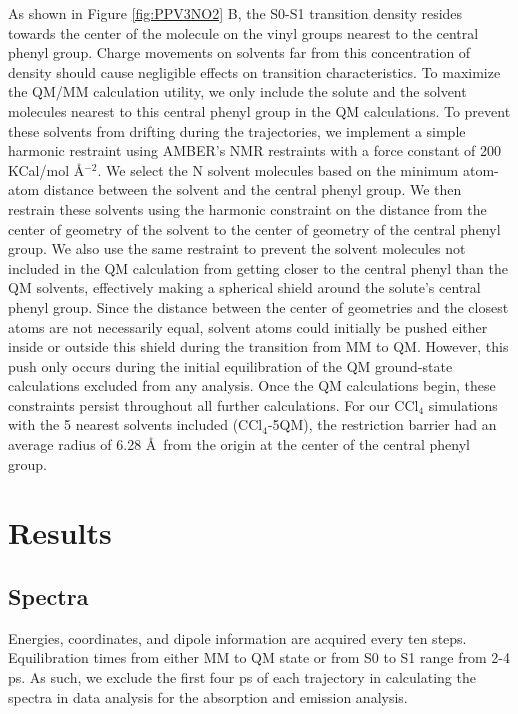 As shown in Figure \ref{fig:PPV3NO2} B, the S0-S1 transition density resides towards the center of the molecule on the vinyl groups nearest to the central phenyl group.
Charge movements on solvents far from this concentration of density should cause negligible effects on transition characteristics.
To maximize the QM/MM calculation utility, we only include the solute and the solvent molecules nearest to this central phenyl group in the QM calculations.
To prevent these solvents from drifting during the trajectories, we implement a simple harmonic restraint using AMBER's NMR restraints with a force constant of 200 KCal/mol \AA\(^{-2}\).
We select the N solvent molecules based on the minimum atom-atom distance between the solvent and the central phenyl group.
We then restrain these solvents using the harmonic constraint on the distance from the center of geometry of the solvent to the center of geometry of the central phenyl group.
We also use the same restraint to prevent the solvent molecules not included in the QM calculation from getting closer to the central phenyl than the QM solvents, effectively making a spherical shield around the solute's central phenyl group.
Since the distance between the center of geometries and the closest atoms are not necessarily equal, solvent atoms could initially be pushed either inside or outside this shield during the transition from MM to QM.
However, this push only occurs during the initial equilibration of the QM ground-state calculations excluded from any analysis.
Once the QM calculations begin, these constraints persist throughout all further calculations.
For our CCl\(_4\) simulations with the 5 nearest solvents included (CCl\(_4\)-5QM), the restriction barrier had an average radius of 6.28 \AA\ from the origin at the center of the central phenyl group.

\section{Results}

\subsection{Spectra}

Energies, coordinates, and dipole information are acquired every ten steps.
Equilibration times from either MM to QM state or from S0 to S1 range from 2-4 ps.
As such, we exclude the first four ps of each trajectory in calculating the spectra in data analysis for the absorption and emission analysis. 

